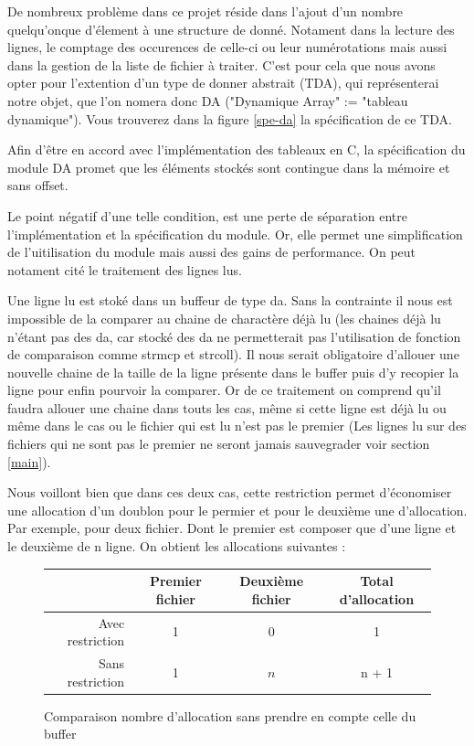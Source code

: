 \documentclass[12pt]{article}
\begin{document}
        De nombreux problème dans ce projet réside dans l'ajout d'un nombre quelqu'onque d'élement à une structure de donné. Notament dans la lecture des lignes, le comptage des occurences de celle-ci ou leur numérotations mais aussi dans la gestion de la liste de fichier à traiter. C'est pour cela que nous avons opter pour l'extention d'un type de donner abstrait (TDA), qui représenterai notre objet, que l'on nomera donc DA ("Dynamique Array" := "tableau dynamique"). Vous trouverez dans la figure \ref{spe-da} la spécification de ce TDA. 

        Afin d'être en accord avec l'implémentation des tableaux en C, la spécification du module DA promet que les éléments stockés sont contingue dans la mémoire et sans offset.
        
        Le point négatif d'une telle condition, est une perte de séparation entre l'implémentation et la spécification du module. Or, elle permet une simplification de l'uitilisation du module mais aussi des gains de performance. On peut notament cité le traitement des lignes lus. 

        Une ligne lu est stoké dans un buffeur de type da. Sans la contrainte il nous est impossible de la comparer au chaine de charactère déjà lu (les chaines déjà lu n'étant pas des da, car stocké des da ne permetterait pas l'utilisation de fonction de comparaison comme strmcp et strcoll). Il nous serait obligatoire d'allouer une nouvelle chaine de la taille de la ligne présente dans le buffer puis d'y recopier la ligne pour enfin pourvoir la comparer. Or de ce traitement on comprend qu'il faudra allouer une chaine dans touts les cas, même si cette ligne est déjà lu ou même dans le cas ou le fichier qui est lu n'est pas le premier (Les lignes lu sur des fichiers qui ne sont pas le premier ne seront jamais sauvegrader voir section \ref{main}). 
        
        Nous voillont bien que dans ces deux cas, cette restriction permet d'économiser une allocation d'un doublon pour le permier et pour le deuxième une d'allocation. Par exemple, pour deux fichier. Dont le premier est composer que d'une ligne et le deuxième de n ligne. On obtient les allocations suivantes :\\
        \begin{figure}[ht]
            \centering
            \begin{tabular}{|r|c|c|c|}
                \hline
                  \cellcolor{gray!25}     & Premier fichier & Deuxième fichier & Total d'allocation \\
                \hline
                Avec restriction  & 1 & 0 & 1 \\
                \hline
                Sans restriction & 1 & $n$ & n + 1\\
                \hline
            \end{tabular}
            \caption{Comparaison nombre d'allocation sans prendre en compte celle du buffer}
            \label{tab-compar-da}
        \end{figure}
\end{document}
